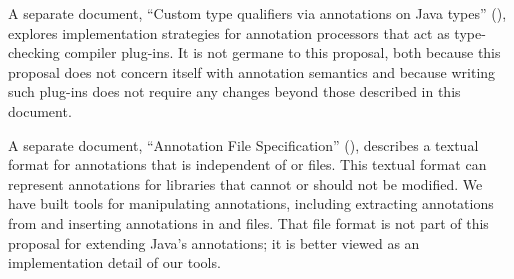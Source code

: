 \documentclass[10pt]{article}
\begin{document}
A separate document, ``Custom type qualifiers via annotations on Java
types'' (),
explores implementation strategies for annotation processors that act as type-checking
compiler plug-ins.  It is not germane to this proposal, both because this proposal
does not concern itself with annotation semantics and because writing such
plug-ins does not require any changes beyond those described in this document.


A separate document, ``Annotation File Specification''
(), describes a
textual format for annotations that is independent of  or
 files.  This textual format can represent annotations for
libraries that cannot or should not be modified.  We have built
tools for manipulating annotations, including extracting
annotations from and inserting annotations in  and
 files.
That file format is not part of this proposal for
extending Java's annotations; it is better viewed as an implementation
detail of our tools.



% 
% 
% 
% 
% 
\end{document}
